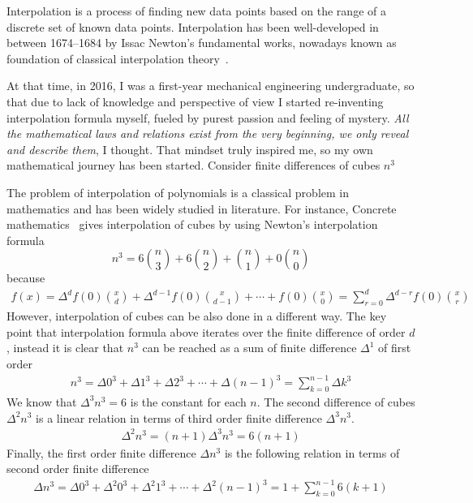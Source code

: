 Interpolation is a process of finding new data points based on the range of a discrete set of known data points.
Interpolation has been well-developed in between 1674--1684
by Issac Newton's fundamental works, nowadays known as foundation of classical interpolation
theory~\cite{meijering2002chronology}.

At that time, in 2016, I was a first-year mechanical engineering undergraduate,
so that due to lack of knowledge and perspective of view I started re-inventing interpolation
formula myself, fueled by purest passion and feeling of mystery.
\textit{All the mathematical laws and relations exist from the very beginning, we only reveal and describe them},
I thought.
That mindset truly inspired me, so my own mathematical journey has been started.
Consider finite differences of cubes $n^3$

The problem of interpolation of polynomials is a classical problem in mathematics and has been widely studied in literature.
For instance, Concrete mathematics~\cite{graham1989concrete} gives interpolation of cubes by using
Newton's interpolation formula
\[
    n^3 = 6 \binom{n}{3} + 6 \binom{n}{2} + \binom{n}{1} + 0 \binom{n}{0}
\]
because
\begin{align*}
    f(x) = \Delta^{d} f(0) \binom{x}{d} +  \Delta^{d-1} f(0) \binom{x}{d-1} + \cdots + f(0) \binom{x}{0}
    = \sum_{r=0}^{d} \Delta^{d-r} f(0) \binom{x}{r}
\end{align*}
However, interpolation of cubes can be also done in a different way.
The key point that interpolation formula above iterates over the finite difference of order $d$,
instead it is clear that $n^3$ can be reached as a sum of finite difference $\Delta^1$ of first order
\begin{align*}
    n^3 = \Delta 0^3 + \Delta 1^3 + \Delta 2^3 + \cdots + \Delta (n-1)^3 = \sum_{k=0}^{n-1} \Delta k^3
\end{align*}
We know that $\Delta^3 n^3 = 6$ is the constant for each $n$.
The second difference of cubes $\Delta^2 n^3$ is a linear relation in terms of third order finite difference
$\Delta^3 n^3$.
\begin{align*}
    \Delta^2 n^3 = (n+1) \Delta^3 n^3 = 6(n+1)
\end{align*}
Finally, the first order finite difference $\Delta n^3$ is the following relation in terms of second
order finite difference
\begin{align*}
    \Delta n^3 = \Delta 0^3 + \Delta^2 0^3 + \Delta^2 1^3 + \cdots + \Delta^2 (n-1)^3 = 1 + \sum_{k=0}^{n-1} 6(k+1)
\end{align*}
